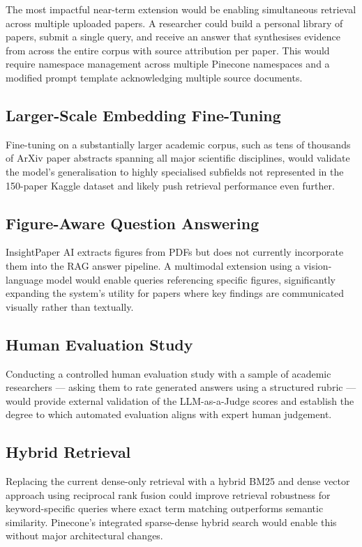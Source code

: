 The most impactful near-term extension would be enabling simultaneous retrieval across multiple uploaded papers. A researcher could build a personal library of papers, submit a single query, and receive an answer that synthesises evidence from across the entire corpus with source attribution per paper. This would require namespace management across multiple Pinecone namespaces and a modified prompt template acknowledging multiple source documents.

\subsection{Larger-Scale Embedding Fine-Tuning}

Fine-tuning on a substantially larger academic corpus, such as tens of thousands of ArXiv paper abstracts spanning all major scientific disciplines, would validate the model's generalisation to highly specialised subfields not represented in the 150-paper Kaggle dataset and likely push retrieval performance even further.

\subsection{Figure-Aware Question Answering}

InsightPaper AI extracts figures from PDFs but does not currently incorporate them into the RAG answer pipeline. A multimodal extension using a vision-language model would enable queries referencing specific figures, significantly expanding the system's utility for papers where key findings are communicated visually rather than textually.

\subsection{Human Evaluation Study}

Conducting a controlled human evaluation study with a sample of academic researchers — asking them to rate generated answers using a structured rubric — would provide external validation of the LLM-as-a-Judge scores and establish the degree to which automated evaluation aligns with expert human judgement.

\subsection{Hybrid Retrieval}

Replacing the current dense-only retrieval with a hybrid BM25 and dense vector approach using reciprocal rank fusion could improve retrieval robustness for keyword-specific queries where exact term matching outperforms semantic similarity. Pinecone's integrated sparse-dense hybrid search would enable this without major architectural changes.


